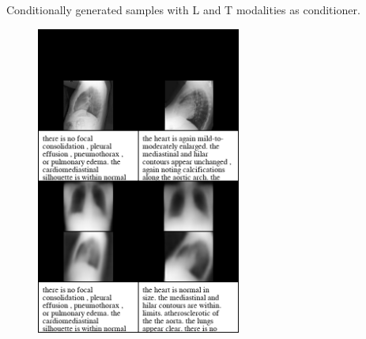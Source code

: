     
    \begin{frame}{Conditionally generated samples with L and T modalities as conditioner.}

    \begin{figure}
    \centering
    \includegraphics[width=0.6\textwidth, height = 0.85\textheight, keepaspectratio]{slides/cond_gen/Lateral_text_blacked.png}
    
\end{figure}
    \end{frame}
    
